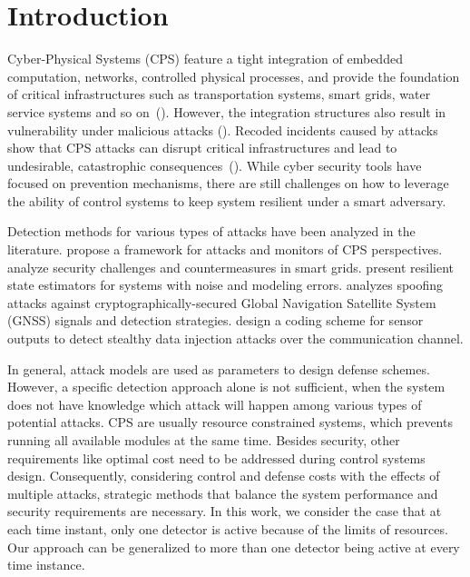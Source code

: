 \section{Introduction}
\label{sec:intro}
Cyber-Physical Systems (CPS) feature a tight integration of embedded computation, networks, controlled physical processes, and provide the foundation of critical infrastructures such as transportation systems, smart grids, water service systems and so on~(\cite{PRKumar_cps}). However, the integration structures also result in vulnerability under malicious attacks (\cite{challenge}). Recoded incidents caused by attacks show that CPS attacks can disrupt critical infrastructures and lead to undesirable, catastrophic consequences~(\cite{scada_ex}). While cyber security tools have focused on prevention mechanisms, there are still challenges on how to leverage the ability of control systems to keep system resilient under a smart adversary. 

Detection methods for various types of attacks have been analyzed in the literature. \cite{Bullo_di} propose a framework for attacks and monitors of CPS perspectives. \cite{Mo_grid} analyze security challenges and countermeasures in smart grids. \cite{res_estimator} present resilient state estimators for systems with noise and modeling errors. \cite{GPS_spoof} analyzes spoofing attacks against cryptographically-secured Global Navigation Satellite System (GNSS) signals and detection strategies. \cite{Miao_coding_tcns16} design a coding scheme for sensor outputs to detect stealthy data injection attacks over the communication channel. %

In general, attack models are used as parameters to design defense schemes. However, a specific detection approach alone is not sufficient, when the system does not have knowledge which attack will happen among various types of potential attacks. CPS are usually resource constrained systems, which prevents running all available modules at the same time. Besides security, other requirements like optimal cost need to be addressed during control systems design. Consequently, considering control and defense costs with the effects of multiple attacks, strategic methods that balance the system performance and security requirements are necessary. In this work, we consider the case that at each time instant, only one detector is active because of the limits of resources. Our approach can be generalized to more than one detector being active at every time instance.

